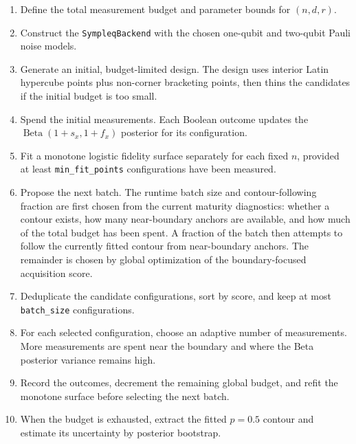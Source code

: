 \begin{enumerate}
    \item Define the total measurement budget and parameter bounds for
    \((n,d,r)\).

    \item Construct the \texttt{SympleqBackend} with the chosen one-qubit and
    two-qubit Pauli noise models.

    \item Generate an initial, budget-limited design.  The design uses interior
    Latin hypercube points plus non-corner bracketing points, then thins the
    candidates if the initial budget is too small.

    \item Spend the initial measurements.  Each Boolean outcome updates the
    \(\operatorname{Beta}(1+s_x,1+f_x)\) posterior for its configuration.

    \item Fit a monotone logistic fidelity surface separately for each fixed
    \(n\), provided at least \texttt{min\_fit\_points} configurations have been
    measured.

    \item Propose the next batch.  The runtime batch size and
    contour-following fraction are first chosen from the current maturity
    diagnostics: whether a contour exists, how many near-boundary anchors are
    available, and how much of the total budget has been spent.  A fraction of
    the batch then attempts to follow the currently fitted contour from
    near-boundary anchors.  The remainder is chosen by global optimization of
    the boundary-focused acquisition score.

    \item Deduplicate the candidate configurations, sort by score, and keep at
    most \texttt{batch\_size} configurations.

    \item For each selected configuration, choose an adaptive number of
    measurements.  More measurements are spent near the boundary and where the
    Beta posterior variance remains high.

    \item Record the outcomes, decrement the remaining global budget, and refit
    the monotone surface before selecting the next batch.

    \item When the budget is exhausted, extract the fitted \(p=0.5\) contour and
    estimate its uncertainty by posterior bootstrap.
\end{enumerate}

